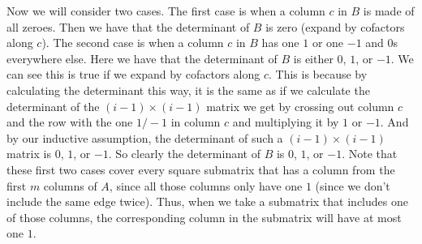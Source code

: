 \documentclass{article}
\begin{document}
\begin{description}
        Now we will consider two cases. The first case is when a column $c$ in
        $B$ is made of all
        zeroes. Then we have that the determinant of $B$ is zero (expand by
        cofactors along $c$). The second case is
        when a column $c$ in $B$ has one $1$ or one $-1$ and $0$s everywhere else.
        Here we have that the determinant of $B$ is either $0$, $1$,
        or $-1$. We can see this is true if we expand by cofactors along $c$.
        This is because by calculating the determinant this way, it is the same
        as if we calculate the determinant of the $(i - 1) \times (i - 1)$
        matrix we get by crossing out column $c$ and the row with the one $1/-1$ in
        column $c$ and multiplying it by $1$ or $-1$. And by our inductive
        assumption, the determinant of such a $(i - 1) \times (i - 1)$ matrix is
        $0$, $1$, or $-1$. So clearly the determinant of $B$ is $0$, $1$, or
        $-1$. Note that these first two cases cover every square submatrix that has a
        column from the first $m$ columns of $A$, since all those columns only
        have one $1$ (since we don't include the same edge twice). Thus, when we
        take a submatrix that includes one of those columns, the corresponding
        column in the submatrix will have at most one $1$.


\end{description}
\end{document}
